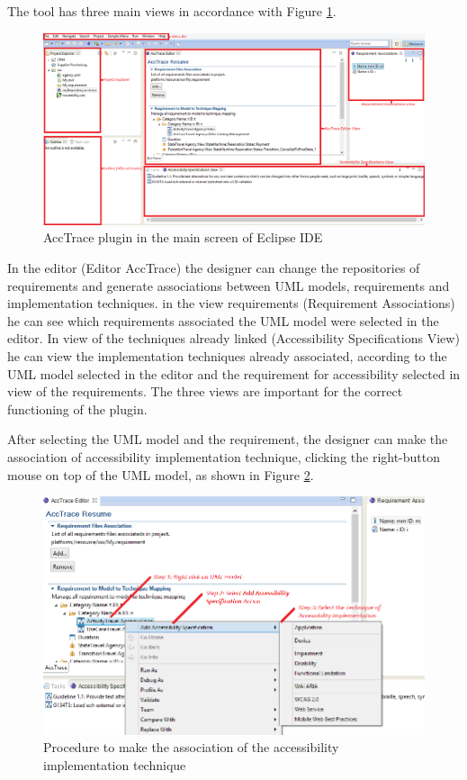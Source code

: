 \documentclass[10pt, conference, compsocconf]{IEEEtran}
\begin{document}
The tool has three main views in accordance with Figure \ref{fig:acctrace}. 

\begin{figure}[h!]
\centering
\includegraphics[scale=0.35]{./img/acctrace.png}
\caption{AccTrace plugin in the main screen of
Eclipse IDE}
\label{fig:acctrace}
\end{figure}

In the editor (Editor AccTrace) the designer can change the repositories of requirements and generate associations between UML models, requirements and implementation techniques. in the view requirements (Requirement Associations) he can see which requirements associated
the UML model were selected in the editor. In view of the techniques already linked
(Accessibility Specifications View) he can view the implementation techniques already
associated, according to the UML model selected in the editor and the requirement for accessibility
selected in view of the requirements. The three views are important for the correct functioning
of the plugin.


After selecting the UML model and the requirement, the designer can make the association of
accessibility implementation technique, clicking the right-button mouse on
top of the UML model, as shown in Figure \ref{fig:rightclick}.


\begin{figure}[h!]
\centering
\includegraphics[scale=0.50]{./img/rightclick.png}
\caption{Procedure to make the association of the accessibility implementation technique}
\label{fig:rightclick}
\end{figure}
\end{document}

